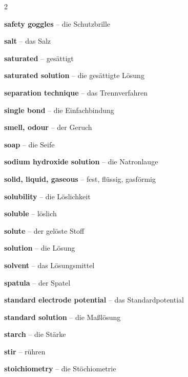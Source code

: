 \begin{multicols}{2}
\par\nopagebreak
\textbf{safety goggles} -- die Schutzbrille\dotfill\hyperref[e:62]{\pageref*{e:62}}\par
\textbf{salt} -- das Salz\dotfill\hyperref[e:167]{\pageref*{e:167}}\par
\textbf{saturated} -- gesättigt\dotfill\hyperref[e:214]{\pageref*{e:214}}\par
\textbf{saturated solution} -- die gesättigte Lösung\dotfill\hyperref[e:14]{\pageref*{e:14}}\par
\textbf{separation technique} -- das Trennverfahren\dotfill\hyperref[e:30]{\pageref*{e:30}}\par
\textbf{single bond} -- die Einfachbindung\dotfill\hyperref[e:112]{\pageref*{e:112}}\par
\textbf{smell, odour} -- der Geruch\dotfill\hyperref[e:22]{\pageref*{e:22}}\par
\textbf{soap} -- die Seife\dotfill\hyperref[e:245]{\pageref*{e:245}}\par
\textbf{sodium hydroxide solution} -- die Natronlauge\dotfill\hyperref[e:181]{\pageref*{e:181}}\par
\textbf{solid, liquid, gaseous} -- fest, flüssig, gasförmig\dotfill\hyperref[e:29]{\pageref*{e:29}}\par
\textbf{solubility} -- die Löslichkeit\dotfill\hyperref[e:13]{\pageref*{e:13}}\par
\textbf{soluble} -- löslich\dotfill\hyperref[e:11]{\pageref*{e:11}}\par
\textbf{solute} -- der gelöste Stoff\dotfill\hyperref[e:10]{\pageref*{e:10}}\par
\textbf{solution} -- die Lösung\dotfill\hyperref[e:8]{\pageref*{e:8}}\par
\textbf{solvent} -- das Lösungsmittel\dotfill\hyperref[e:9]{\pageref*{e:9}}\par
\textbf{spatula} -- der Spatel\dotfill\hyperref[e:52]{\pageref*{e:52}}\par
\textbf{standard electrode potential} -- das Standardpotential\dotfill\hyperref[e:202]{\pageref*{e:202}}\par
\textbf{standard solution} -- die Maßlösung\dotfill\hyperref[e:176]{\pageref*{e:176}}\par
\textbf{starch} -- die Stärke\dotfill\hyperref[e:243]{\pageref*{e:243}}\par
\textbf{stir} -- rühren\dotfill\hyperref[e:66]{\pageref*{e:66}}\par
\textbf{stoichiometry} -- die Stöchiometrie\dotfill\hyperref[e:258]{\pageref*{e:258}}\par

\end{multicols}
